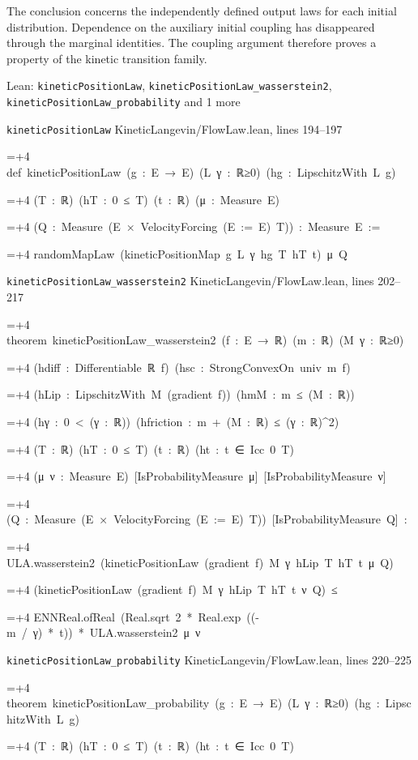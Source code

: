 \documentclass[11pt,a4paper]{article}
\newlength{\leancharwidth}
\newenvironment{leancode}{\par\smallskip\begingroup\ttfamily\footnotesize\raggedright
  \settowidth{\leancharwidth}{M}\setlength{\parskip}{0pt}\setlength{\parindent}{0pt}
  \frenchspacing}{\par\endgroup\smallskip}
\newcommand{\leanline}[2]{\hangindent=\dimexpr#1\leancharwidth+4\leancharwidth\relax
  \hangafter=1\noindent\hspace*{#1\leancharwidth}#2\par}
\newcommand{\leansource}[1]{\par{\footnotesize\color{leanmuted}#1}\par}
\begin{document}
The conclusion concerns the independently defined output laws for each initial distribution. Dependence on the auxiliary initial coupling has disappeared through the marginal identities. The coupling argument therefore proves a property of the kinetic transition family.

\begin{leanbox}{Lean: \texttt{kineticPositionLaw}, \texttt{kineticPositionLaw\_\allowbreak{}wasserstein2}, \texttt{kineticPositionLaw\_\allowbreak{}probability} and 1 more}
\leansource{\texttt{kineticPositionLaw} \quad KineticLangevin/\allowbreak{}FlowLaw.lean, lines 194–197}
\begin{leancode}
\leanline{0}{def\ kineticPositionLaw\ (g\ :\ E\ →\ E)\ (L\ γ\ :\ ℝ≥0)\ (hg\ :\ LipschitzWith\ L\ g)}
\leanline{4}{(T\ :\ ℝ)\ (hT\ :\ 0\ ≤\ T)\ (t\ :\ ℝ)\ (μ\ :\ Measure\ E)}
\leanline{4}{(Q\ :\ Measure\ (E\ ×\ VelocityForcing\ (E\ :=\ E)\ T))\ :\ Measure\ E\ :=}
\leanline{2}{randomMapLaw\ (kineticPositionMap\ g\ L\ γ\ hg\ T\ hT\ t)\ μ\ Q}
\end{leancode}
\leansource{\texttt{kineticPositionLaw\_\allowbreak{}wasserstein2} \quad KineticLangevin/\allowbreak{}FlowLaw.lean, lines 202–217}
\begin{leancode}
\leanline{0}{theorem\ kineticPositionLaw\_wasserstein2\ (f\ :\ E\ →\ ℝ)\ (m\ :\ ℝ)\ (M\ γ\ :\ ℝ≥0)}
\leanline{4}{(hdiff\ :\ Differentiable\ ℝ\ f)\ (hsc\ :\ StrongConvexOn\ univ\ m\ f)}
\leanline{4}{(hLip\ :\ LipschitzWith\ M\ (gradient\ f))\ (hmM\ :\ m\ ≤\ (M\ :\ ℝ))}
\leanline{4}{(hγ\ :\ 0\ <\ (γ\ :\ ℝ))\ (hfriction\ :\ m\ +\ (M\ :\ ℝ)\ ≤\ (γ\ :\ ℝ)\textasciicircum{}2)}
\leanline{4}{(T\ :\ ℝ)\ (hT\ :\ 0\ ≤\ T)\ (t\ :\ ℝ)\ (ht\ :\ t\ ∈\ Icc\ 0\ T)}
\leanline{4}{(μ\ ν\ :\ Measure\ E)\ [IsProbabilityMeasure\ μ]\ [IsProbabilityMeasure\ ν]}
\leanline{4}{(Q\ :\ Measure\ (E\ ×\ VelocityForcing\ (E\ :=\ E)\ T))\ [IsProbabilityMeasure\ Q]\ :}
\leanline{4}{ULA.wasserstein2\ (kineticPositionLaw\ (gradient\ f)\ M\ γ\ hLip\ T\ hT\ t\ μ\ Q)}
\leanline{6}{(kineticPositionLaw\ (gradient\ f)\ M\ γ\ hLip\ T\ hT\ t\ ν\ Q)\ ≤}
\leanline{8}{ENNReal.ofReal\ (Real.sqrt\ 2\ *\ Real.exp\ ((-m\ /\ γ)\ *\ t))\ *\ ULA.wasserstein2\ μ\ ν}
\end{leancode}
\leansource{\texttt{kineticPositionLaw\_\allowbreak{}probability} \quad KineticLangevin/\allowbreak{}FlowLaw.lean, lines 220–225}
\begin{leancode}
\leanline{0}{theorem\ kineticPositionLaw\_probability\ (g\ :\ E\ →\ E)\ (L\ γ\ :\ ℝ≥0)\ (hg\ :\ LipschitzWith\ L\ g)}
\leanline{4}{(T\ :\ ℝ)\ (hT\ :\ 0\ ≤\ T)\ (t\ :\ ℝ)\ (ht\ :\ t\ ∈\ Icc\ 0\ T)}

\end{leancode}
\end{leanbox}
\end{document}
